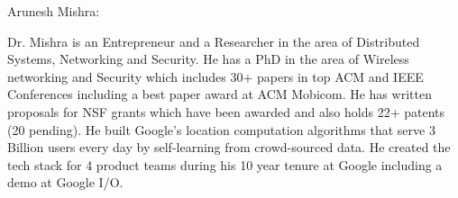 \documentclass[journal]{IEEEtran}
\begin{document}
\ifCLASSOPTIONcaptionsoff
  \newpage
\fi




% 
%
%



\begin{IEEEbiographynophoto}{Arunesh Mishra:}

Dr. Mishra is an Entrepreneur and a Researcher in the area of Distributed Systems, Networking and
    Security.  He has a PhD in the area of Wireless networking and Security which includes 30+ papers in top ACM and
    IEEE Conferences including a best paper award at ACM Mobicom. He has written proposals for NSF grants which have
    been awarded and also holds 22+ patents (20 pending). He built Google’s location
    computation algorithms that serve 3 Billion users every day by self-learning from crowd-sourced data. He created the
    tech stack for 4 product teams during his 10 year tenure at
    Google including a demo at Google I/O.  \end{IEEEbiographynophoto}
\end{document}
